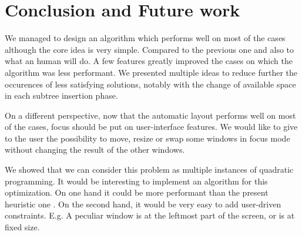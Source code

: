 \documentclass{acmtog}
\begin{document}
\section{Conclusion and Future work}

We managed to design an algorithm which performs well on most of the cases although the core idea is very simple. Compared to the previous one and also to what an human will do. A few features greatly improved the cases on which the algorithm was less performant. We presented multiple ideas to reduce further the occurences of less satisfying solutions, notably with the change of available space in each subtree insertion phase.

On a different perspective, now that the automatic layout performs well on most of the cases, focus should be put on user-interface features. We would like to give to the user the possibility to move, resize or swap some windows in focus mode without changing the result of the other windows. 

We showed that we can consider this problem as multiple instances of quadratic programming. It would be interesting to implement an algorithm for this optimization. On one hand it could be more performant than the present heuristic one
. On the second hand, it would be very easy to add user-driven constraints. E.g. A peculiar window is at the leftmost part of the screen, or is at fixed size.



\begin{acks}
 
\end{acks}


 
\end{document}
